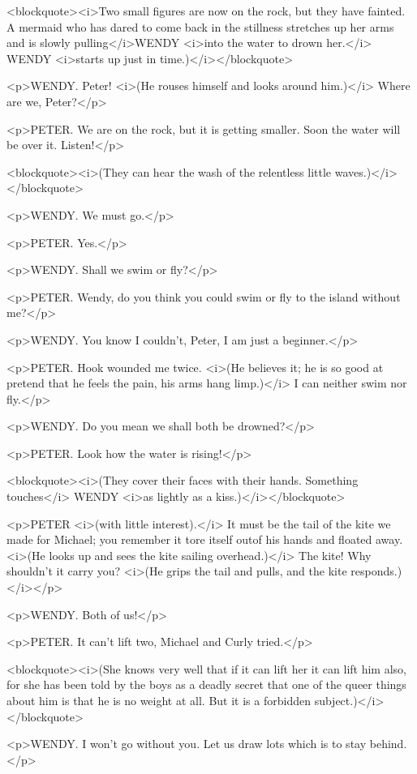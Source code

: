 <blockquote><i>Two small figures are now on the rock, but they have fainted. A mermaid who has dared to come back in the stillness stretches up her arms and is slowly pulling</i>WENDY <i>into the water to drown her.</i> WENDY <i>starts up just in time.)</i></blockquote>

<p>WENDY. Peter! <i>(He rouses himself and looks around him.)</i> Where are we, Peter?</p>

<p>PETER. We are on the rock, but it is getting smaller. Soon the water will be over it. Listen!</p>

<blockquote><i>(They can hear the wash of the relentless little waves.)</i></blockquote>

<p>WENDY. We must go.</p>

<p>PETER. Yes.</p>

<p>WENDY. Shall we swim or fly?</p>

<p>PETER. Wendy, do you think you could swim or fly to the island without me?</p>

<p>WENDY. You know I couldn't, Peter, I am just a beginner.</p>

<p>PETER. Hook wounded me twice. <i>(He believes it; he is so good at pretend that he feels the pain, his arms hang limp.)</i> I can neither swim nor fly.</p>

<p>WENDY. Do you mean we shall both be drowned?</p>

<p>PETER. Look how the water is rising!</p>

<blockquote><i>(They cover their faces with their hands. Something touches</i> WENDY <i>as lightly as a kiss.)</i></blockquote>

<p>PETER <i>(with little interest).</i> It must be the tail of the kite we made for Michael; you remember it tore itself outof his hands and floated away. <i>(He looks up and sees the kite sailing overhead.)</i> The kite! Why shouldn't it carry you? <i>(He grips the tail and pulls, and the kite responds.)</i></p>

<p>WENDY. Both of us!</p>

<p>PETER. It can't lift two, Michael and Curly tried.</p>

<blockquote><i>(She knows very well that if it can lift her it can lift him also, for she has been told by the boys as a deadly secret that one of the queer things about him is that he is no weight at all. But it is a forbidden subject.)</i></blockquote>

<p>WENDY. I won't go without you. Let us draw lots which is to stay behind.</p>

